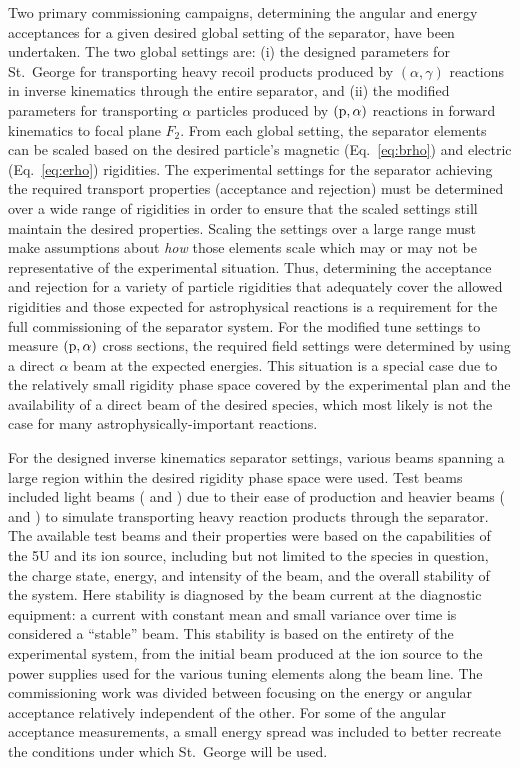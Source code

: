 Two primary commissioning campaigns, determining the angular and energy
acceptances for a given desired global setting of the separator, have
been undertaken. The two global settings are: (i) the designed
parameters for St.\ George for transporting heavy recoil products
produced by $(\alpha,\gamma)$ reactions in inverse kinematics through
the entire separator, and (ii) the modified parameters for transporting
$\alpha$ particles produced by $({\rm p},\alpha)$ reactions in forward
kinematics to focal plane $F_2$. From each global setting, the separator
elements can be scaled based on the desired particle's magnetic
(Eq.~\ref{eq:brho}) and electric (Eq.~\ref{eq:erho}) rigidities. The
experimental settings for the separator achieving the required transport
properties (acceptance and rejection) must be determined over a wide
range of rigidities in order to ensure that the scaled settings still
maintain the desired properties. Scaling the settings over a large range
must make assumptions about \emph{how} those elements scale which may or
may not be representative of the experimental situation. Thus,
determining the acceptance and rejection for a variety of particle
rigidities that adequately cover the allowed rigidities and those
expected for astrophysical reactions is a requirement for the full
commissioning of the separator system. For the modified tune settings to
measure $({\rm p},\alpha)$ cross sections, the required field settings
were determined by using a direct $\alpha$ beam at the expected
energies. This situation is a special case due to the relatively small
rigidity phase space covered by the experimental plan and the
availability of a direct beam of the desired species, which most likely
is not the case for many astrophysically-important reactions.

For the designed inverse kinematics separator settings, various beams
spanning a large region within the desired rigidity phase space were
used. Test beams included light beams ( and ) due
to their ease of production and heavier beams ( and
) to simulate transporting heavy reaction products through
the separator. The available test beams and their properties were based
on the capabilities of the 5U and its ion source, including but not
limited to the species in question, the charge state, energy, and
intensity of the beam, and the overall stability of the system. Here
stability is diagnosed by the beam current at the diagnostic equipment:
a current with constant mean and small variance over time is considered
a ``stable'' beam. This stability is based on the entirety of the
experimental system, from the initial beam produced at the ion source to
the power supplies used for the various tuning elements along the beam
line. The commissioning work was divided between focusing on the energy
or angular acceptance relatively independent of the other. For some of
the angular acceptance measurements, a small energy spread was included
to better recreate the conditions under which St.\ George will be used.



